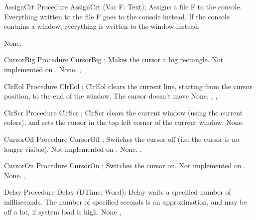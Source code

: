 \begin{procedure}{AssignCrt}
\Declaration
Procedure AssignCrt (Var F: Text);
\Description
{} Assigns a file F to the console. Everything written to 
the file F goes to the console instead. If the console contains a window, 
everything is written to the window instead.

\Errors
None.
\SeeAlso
{}
\end{procedure}

 
\begin{procedure}{CursorBig}
\Declaration
Procedure CursorBig ;
\Description
Makes the cursor a big rectangle. 
Not implemented on \linux.
\Errors
None.
\SeeAlso
{}, 
\end{procedure}

\begin{procedure}{ClrEol}
\Declaration
Procedure ClrEol ;
\Description
 ClrEol clears the current line, starting from the cursor position, to the
end of the window. The cursor doesn't move
\Errors
None.
\SeeAlso
{}, , 
\end{procedure}

 
\begin{procedure}{ClrScr}
\Declaration
Procedure ClrScr ;
\Description
 ClrScr clears the current window (using the current colors), 
and sets the cursor in the top left
corner of the current window.
\Errors
None.
\SeeAlso
\end{procedure}

 
\begin{procedure}{CursorOff}
\Declaration
Procedure CursorOff ;
\Description
Switches the cursor off (i.e. the cursor is no
longer visible). 
Not implemented on \linux.
\Errors
None.
\SeeAlso
{}, 
\end{procedure}
\begin{procedure}{CursorOn}
\Declaration
Procedure CursorOn ;
\Description
Switches the cursor on. 
Not implemented on \linux.
\Errors
None.
\SeeAlso
{}, 
\end{procedure}
\begin{procedure}{Delay}
\Declaration
Procedure Delay (DTime: Word);
\Description
Delay waits a specified number of milliseconds. The number of specified
seconds is an approximation, and may be off a lot, if system load is high.
\Errors
None
\SeeAlso
{}, 
\end{procedure}


